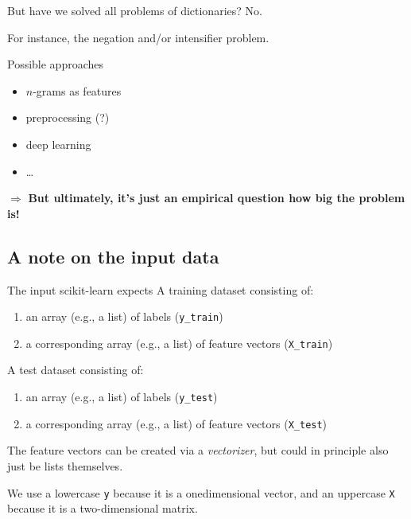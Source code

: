 \begin{frame}{But have we solved all problems of dictionaries?}
  No.
  
  For instance, the negation and/or intensifier problem.
  
  Possible approaches
  \begin{itemize}
  \item $n$-grams as features
  \item preprocessing (?)
  \item deep learning 
  \item \ldots
  \end{itemize}
  \pause
	
  $\Rightarrow$ \textbf{But ultimately, it's just an empirical question how big the problem is!}
	
	
\end{frame}


\subsection{A note on the input data}

\begin{frame}{The input scikit-learn expects}
  A training dataset consisting of:
  \begin{enumerate}
  \item an array (e.g., a list) of labels (\texttt{y\_train})
  \item a corresponding array (e.g., a list) of feature vectors (\texttt{X\_train})
  \end{enumerate}
	
	A test dataset consisting of:
	\begin{enumerate}
	\item an array (e.g., a list) of labels (\texttt{y\_test})
	\item a corresponding array (e.g., a list) of feature vectors (\texttt{X\_test})
	\end{enumerate}
	
	The feature vectors can be created via a \textit{vectorizer}, but could in principle also just be lists themselves.
	
	We use a lowercase \texttt{y} because it is a onedimensional vector, and an uppercase \texttt{X} because it is a two-dimensional matrix.
\end{frame}


